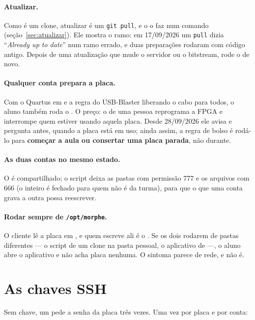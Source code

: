 \paragraph{Atualizar.} Como  é um clone, atualizar é um
\texttt{git pull}, e o  o faz num comando
(seção~\ref{sec:atualizar}). Ele mostra o ramo: em 17/09/2026 um
\texttt{pull} dizia ``\emph{Already up to date}'' num ramo errado, e duas
preparações rodaram com código antigo. Depois de uma atualização que mude o
servidor ou o bitstream, rode o   de novo.

\paragraph{Qualquer conta prepara a placa.} Com o Quartus em  e a
regra do USB-Blaster liberando o cabo para todos, o aluno também roda o
. O preço: o  de uma pessoa reprograma a
FPGA e interrompe quem estiver usando aquela placa. Desde 28/09/2026 ele avisa
e pergunta antes, quando a placa está em uso; ainda assim, a regra de bolso é
rodá-lo para \textbf{começar a aula ou consertar uma placa parada}, não durante.

\paragraph{As duas contas no mesmo estado.} O  é
compartilhado; o script deixa as pastas com permissão 777 e os arquivos com 666
(o  inteiro é fechado para quem não é da turma), para que o
que uma conta grava a outra possa reescrever.

\paragraph{Rodar sempre de \texttt{/opt/morphe}.} O cliente lê a placa em
, e quem escreve ali é o . Se os
dois rodarem de pastas diferentes --- o script de um clone na pasta pessoal, o
aplicativo de  ---, o aluno abre o aplicativo e não acha
placa nenhuma. O sintoma parece de rede, e não é.

\section{As chaves SSH}
\label{sec:ssh}

Sem chave, um  pede a senha da placa três vezes. Uma vez por
placa e por conta:


